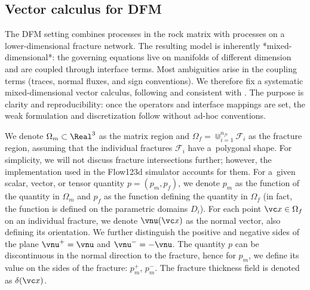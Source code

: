 \subsection{Vector calculus for DFM}
\label{sec:vek_pocet_dfm}
The DFM setting combines processes in the rock matrix with processes on a lower-dimensional fracture network. The resulting model is inherently *mixed-dimensional*: the governing equations live on manifolds of different dimension and are coupled through interface terms. Most ambiguities arise in the coupling terms (traces, normal fluxes, and sign conventions). We therefore fix a systematic mixed-dimensional vector calculus, following \cite{BrezinaMethodology2023} and consistent with \cite{flow123d}. The purpose is clarity and reproducibility: once the operators and interface mappings are set, the weak formulation and discretization follow without ad-hoc conventions.

We denote $\Omega_m \subset \Real^3$ as the matrix region and $\Omega_f=\Cup_{i=1}^{n_{fr}}\mathcal F_i$ as the fracture region, assuming that the individual fractures $\mathcal F_i$ have a~polygonal shape.
For simplicity, we will not discuss fracture intersections further; however, the implementation used in the Flow123d simulator accounts for them. For a~given scalar, vector, or tensor quantity $p=(p_m, p_f)$, we denote $p_m$ as the function of the quantity in $\Omega_m$ and $p_f$ as the function defining the quantity in $\Omega_f$ (in fact, the function is defined on the parametric domains $D_i$). For each point $\vc x \in \Omega_f$ on an individual fracture, we denote $\vnu(\vc x)$ as the normal vector, also defining its orientation. We further distinguish the positive and negative sides of the plane $\vnu^+ = \vnu$ and $\vnu^-=-\vnu$. The quantity $p$ can be discontinuous in the normal direction to the fracture, hence for $p_m$, we define its value on the sides of the fracture: $p_m^+$, $p_m^-$. The fracture thickness field is denoted as $\delta(\vc x)$.

